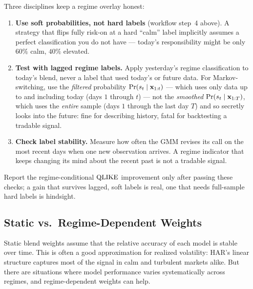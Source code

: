 \begin{warning}
Three disciplines keep a regime overlay honest:
\begin{enumerate}
  \item \textbf{Use soft probabilities, not hard labels} (workflow
        step~4 above).  A strategy that flips fully risk-on at a hard
        ``calm'' label implicitly assumes a perfect classification you do
        not have --- today's responsibility might be only $60\%$ calm,
        $40\%$ elevated.
  \item \textbf{Test with lagged regime labels.}  Apply yesterday's
        regime classification to today's blend, never a label that used
        today's or future data.  For Markov-switching, use the
        \emph{filtered} probability $\Pr(s_t \mid \mathbf{x}_{1:t})$ --- which uses
        only data up to and including today (days $1$ through $t$) --- not
        the \emph{smoothed} $\Pr(s_t \mid \mathbf{x}_{1:T})$, which uses the
        \emph{entire} sample (days $1$ through the last day $T$) and so
        secretly looks into the future: fine for describing history, fatal
        for backtesting a tradable signal.
  \item \textbf{Check label stability.}  Measure how often the GMM
        revises its call on the most recent days when one new observation
        arrives.  A regime indicator that keeps changing its mind about
        the recent past is not a tradable signal.
\end{enumerate}
Report the regime-conditional $\operatorname{QLIKE}$ improvement only after passing
these checks; a gain that survives lagged, soft labels is real, one that
needs full-sample hard labels is hindsight.
\end{warning}



\subsection{Static vs.\ Regime-Dependent Weights}
\label{sec:hybrid:regime-weights}

Static blend weights assume that the relative accuracy of each model is
stable over time.  This is often a good approximation for realized
volatility: HAR's linear structure captures most of the signal in calm
and turbulent markets alike.  But there are situations where model
performance varies systematically across regimes, and regime-dependent
weights can help.

